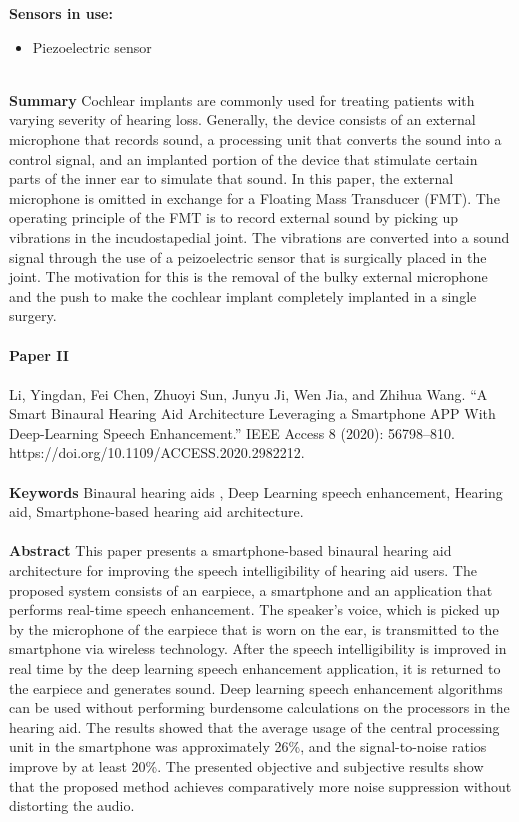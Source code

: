 \noindent
\textbf{Sensors in use:}
\begin{itemize}
    \item Piezoelectric sensor \\ \\
\end{itemize}

\noindent
\textbf{Summary} Cochlear implants are commonly used for treating patients with varying severity of hearing loss. Generally, the device consists of an external microphone that records sound, a processing unit that converts the sound into a control signal, and an implanted portion of the device that stimulate certain parts of the inner ear to simulate that sound. In this paper, the external microphone is omitted in exchange for a Floating Mass Transducer (FMT). The operating principle of the FMT is to record external sound by picking up vibrations in the incudostapedial joint. The vibrations are converted into a sound signal through the use of a peizoelectric sensor that is surgically placed in the joint. The motivation for this is the removal of the bulky external microphone and the push to make the cochlear implant completely implanted in a single surgery. \\ \\


\textbf{Paper II} 
\\ \\
\noindent
Li, Yingdan, Fei Chen, Zhuoyi Sun, Junyu Ji, Wen Jia, and Zhihua Wang. “A Smart Binaural Hearing Aid Architecture Leveraging a Smartphone APP With Deep-Learning Speech Enhancement.” IEEE Access 8 (2020): 56798–810. https://doi.org/10.1109/ACCESS.2020.2982212. \\ \\

\noindent
\textbf{Keywords} Binaural hearing aids , Deep Learning speech enhancement, Hearing aid, Smartphone-based hearing aid architecture. \\ \\

\noindent
\textbf{Abstract} This paper presents a smartphone-based binaural hearing aid architecture for improving the speech intelligibility of hearing aid users. The proposed system consists of an earpiece, a smartphone and an application that performs real-time speech enhancement. The speaker's voice, which is picked up by the microphone of the earpiece that is worn on the ear, is transmitted to the smartphone via wireless technology. After the speech intelligibility is improved in real time by the deep learning speech enhancement application, it is returned to the earpiece and generates sound. Deep learning speech enhancement algorithms can be used without performing burdensome calculations on the processors in the hearing aid. The results showed that the average usage of the central processing unit in the smartphone was approximately 26\%, and the signal-to-noise ratios improve by at least 20\%. The presented objective and subjective results show that the proposed method achieves comparatively more noise suppression without distorting the audio. \\ \\

